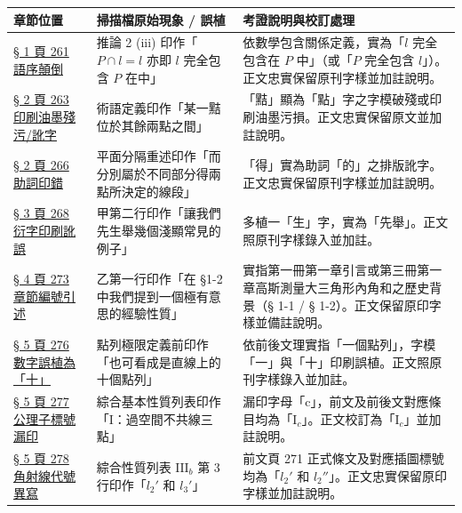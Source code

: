 \documentclass[a4paper,12pt,twoside]{article}
\begin{document}
\begin{table}[H]
\centering
\small
\renewcommand{\arraystretch}{1.35}
\begin{tabularx}{\textwidth}{|p{3.2cm}|p{3.8cm}|X|}
\hline
\textbf{章節位置} & \textbf{掃描檔原始現象 / 誤植} & \textbf{考證說明與校訂處理} \\ \hline

\hyperref[note:b3-a1-p261-order]{§ 1 頁 261 語序顛倒} & 
推論 2 (iii) 印作「$P \cap l = l$ 亦即 $l$ 完全包含 $P$ 在中」 & 
依數學包含關係定義，實為「$l$ 完全包含在 $P$ 中」（或「$P$ 完全包含 $l$」）。正文忠實保留原刊字樣並加註說明。 \\ \hline

\hyperref[note:b3-a1-p263-point]{§ 2 頁 263 印刷油墨殘污/訛字} & 
術語定義印作「某一黠位於其餘兩點之間」 & 
「黠」顯為「點」字之字模破殘或印刷油墨污損。正文忠實保留原文並加註說明。 \\ \hline

\hyperref[note:b3-a1-p266-de]{§ 2 頁 266 助詞印錯} & 
平面分隔重述印作「而分別屬於不同部分得兩點所決定的線段」 & 
「得」實為助詞「的」之排版訛字。正文忠實保留原刊字樣並加註說明。 \\ \hline

\hyperref[note:b3-a1-p268-xian]{§ 3 頁 268 衍字印刷訛誤} & 
甲第二行印作「讓我們先生舉幾個淺顯常見的例子」 & 
多植一「生」字，實為「先舉」。正文照原刊字樣錄入並加註。 \\ \hline

\hyperref[note:b3-a1-p273-sec]{§ 4 頁 273 章節編號引述} & 
乙第一行印作「在 \S 1-2 中我們提到一個極有意思的經驗性質」 & 
實指第一冊第一章引言或第三冊第一章高斯測量大三角形內角和之歷史背景（§ 1-1 / § 1-2）。正文保留原印字樣並備註說明。 \\ \hline

\hyperref[note:b3-a1-p276-ten]{§ 5 頁 276 數字誤植為「十」} & 
點列極限定義前印作「也可看成是直線上的十個點列」 & 
依前後文理實指「一個點列」，字模「一」與「十」印刷誤植。正文照原刊字樣錄入並加註。 \\ \hline

\hyperref[note:b3-a1-p277-ic]{§ 5 頁 277 公理子標號漏印} & 
綜合基本性質列表印作「$\mathrm{I}$：過空間不共線三點」 & 
漏印字母「c」，前文及前後文對應條目均為「$\mathrm{I}_c$」。正文校訂為「$\mathrm{I}_c$」並加註說明。 \\ \hline

\hyperref[note:b3-a1-p278-l3p]{§ 5 頁 278 角射線代號異寫} & 
綜合性質列表 $\mathrm{III}_b$ 第 3 行印作「$l_2'$ 和 $l_3'$」 & 
前文頁 271 正式條文及對應插圖標號均為「$l_2'$ 和 $l_2''$」。正文忠實保留原印字樣並加註說明。 \\ \hline

\end{tabularx}
\end{table}

\clearpage
\tableofcontents
\newpage


\end{document}
